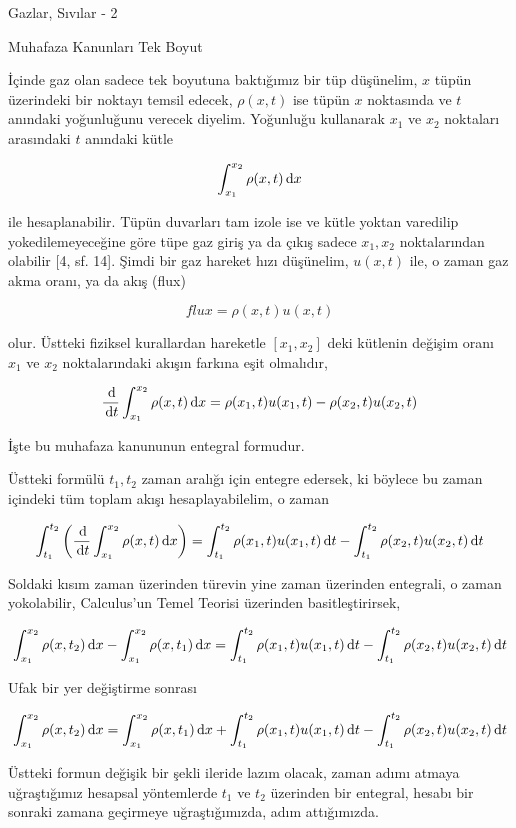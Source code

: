 \documentclass[12pt,fleqn]{article}\usepackage{../../common}
\begin{document}
Gazlar, Sıvılar - 2

Muhafaza Kanunları Tek Boyut

İçinde gaz olan sadece tek boyutuna baktığımız bir tüp düşünelim, $x$ tüpün
üzerindeki bir noktayı temsil edecek, $\rho(x,t)$ ise tüpün $x$ noktasında ve
$t$ anındaki yoğunluğunu verecek diyelim. Yoğunluğu kullanarak $x_1$ ve $x_2$
noktaları arasındaki $t$ anındaki kütle

$$
\int _{x_1}^{x_2} \rho(x,t) \,\mathrm{d} x
$$

ile hesaplanabilir. Tüpün duvarları tam izole ise ve kütle yoktan varedilip
yokedilemeyeceğine göre tüpe gaz giriş ya da çıkış sadece $x_1,x_2$
noktalarından olabilir [4, sf. 14]. Şimdi bir gaz hareket hızı düşünelim,
$u(x,t)$ ile, o zaman gaz akma oranı, ya da akış (flux)

$$
flux = \rho(x,t) u(x,t)
$$

olur. Üstteki fiziksel kurallardan hareketle $[x_1,x_2]$ deki kütlenin
değişim oranı $x_1$ ve $x_2$ noktalarındaki akışın farkına eşit olmalıdır,

$$
\frac{\,\mathrm{d}}{\,\mathrm{d} t} \int _{x_1}^{x_2} \rho(x,t) \,\mathrm{d} x =
\rho(x_1,t) u(x_1,t) - \rho(x_2,t) u(x_2,t)
$$

İşte bu muhafaza kanununun entegral formudur. 

Üstteki formülü $t_1,t_2$ zaman aralığı için entegre edersek, ki böylece
bu zaman içindeki tüm toplam akışı hesaplayabilelim, o zaman

$$
\int_{t_1}^{t_2} \left( \frac{\,\mathrm{d}}{\,\mathrm{d} t} \int _{x_1}^{x_2} \rho(x,t) \,\mathrm{d} x  \right)  =
\int_{t_1}^{t_2} \rho(x_1,t) u(x_1,t) \,\mathrm{d} t -
\int_{t_1}^{t_2} \rho(x_2,t) u(x_2,t) \,\mathrm{d} t
$$

Soldaki kısım zaman üzerinden türevin yine zaman üzerinden entegrali, o zaman
yokolabilir, Calculus'un Temel Teorisi üzerinden basitleştirirsek,

$$
\int _{x_1}^{x_2} \rho(x,t_2) \,\mathrm{d} x -
\int _{x_1}^{x_2} \rho(x,t_1) \,\mathrm{d} x  = 
\int_{t_1}^{t_2} \rho(x_1,t) u(x_1,t) \,\mathrm{d} t -
\int_{t_1}^{t_2}  \rho(x_2,t) u(x_2,t) \,\mathrm{d} t
$$

Ufak bir yer değiştirme sonrası

$$
\int _{x_1}^{x_2} \rho(x,t_2) \,\mathrm{d} x =
\int _{x_1}^{x_2} \rho(x,t_1) \,\mathrm{d} x  +
\int_{t_1}^{t_2} \rho(x_1,t) u(x_1,t) \,\mathrm{d} t -
\int_{t_1}^{t_2}  \rho(x_2,t) u(x_2,t) \,\mathrm{d} t
$$

Üstteki formun değişik bir şekli ileride lazım olacak, zaman adımı atmaya
uğraştığımız hesapsal yöntemlerde $t_1$ ve $t_2$ üzerinden bir entegral, hesabı
bir sonraki zamana geçirmeye uğraştığımızda, adım attığımızda.
\end{document}
